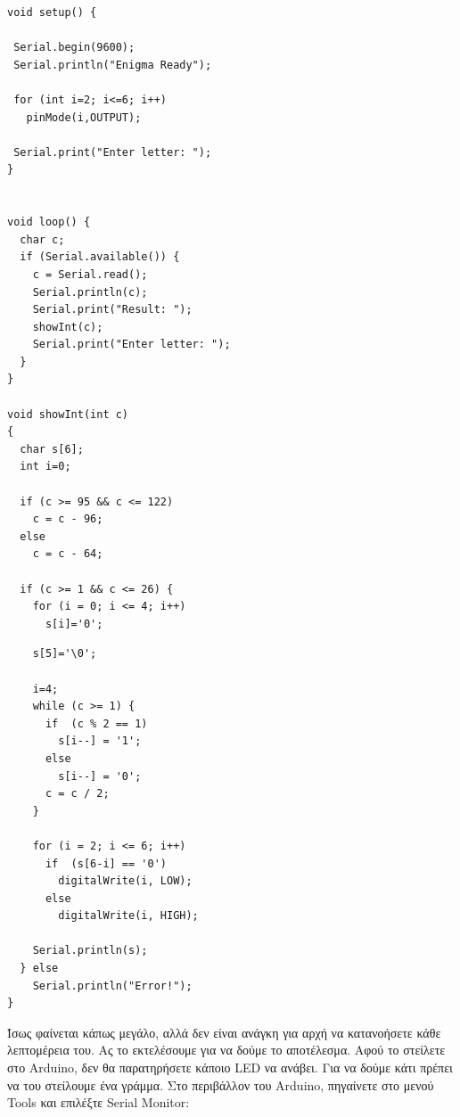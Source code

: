 \documentclass[a4paper,twoside,12pt]{article}
\begin{document}
\begin{verbatim}
void setup() { 

 Serial.begin(9600);
 Serial.println("Enigma Ready"); 
    
 for (int i=2; i<=6; i++)
   pinMode(i,OUTPUT);
 
 Serial.print("Enter letter: ");
}


void loop() {
  char c;
  if (Serial.available()) {
    c = Serial.read();
    Serial.println(c); 
    Serial.print("Result: ");
    showInt(c);
    Serial.print("Enter letter: ");
  }
}

void showInt(int c)
{
  char s[6];
  int i=0;
 
  if (c >= 95 && c <= 122)
    c = c - 96;
  else
    c = c - 64;

  if (c >= 1 && c <= 26) {
    for (i = 0; i <= 4; i++)
      s[i]='0';
\end{verbatim} 
\begin{verbatim}  
    s[5]='\0';
    
    i=4;
    while (c >= 1) {
      if  (c % 2 == 1)
        s[i--] = '1';
      else
        s[i--] = '0';
      c = c / 2;
    }
  
    for (i = 2; i <= 6; i++)
      if  (s[6-i] == '0')
        digitalWrite(i, LOW);
      else
        digitalWrite(i, HIGH);
      
    Serial.println(s);
  } else
    Serial.println("Error!");
}
\end{verbatim}

Ίσως φαίνεται κάπως μεγάλο, αλλά δεν είναι ανάγκη για αρχή να κατανοήσετε κάθε λεπτομέρεια του. Ας το εκτελέσουμε για να δούμε το αποτέλεσμα. Αφού το στείλετε στο Arduino, δεν θα παρατηρήσετε κάποιο LED να ανάβει. Για να δούμε κάτι πρέπει να του στείλουμε ένα γράμμα.  Στο περιβάλλον του Arduino, πηγαίνετε στο μενού Tools και επιλέξτε Serial Monitor:
\end{document}
